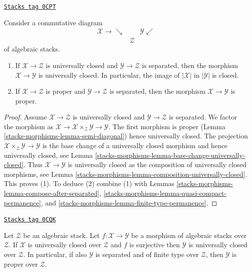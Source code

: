 \begin{lemma}
\label{stacks-morphisms-lemma-universally-closed-permanence}
\href{https://stacks.math.columbia.edu/tag/0CPT}{\texttt{Stacks tag 0CPT}}

Consider a commutative diagram
$$
\begin{array}{ccc}\mathcal{X} \longrightarrow\searrow &  & \mathcal{Y} \swarrow \\  & \mathcal{Z} & \end{array}
$$
of algebraic stacks.
\begin{enumerate}
\item If $\mathcal{X} \to \mathcal{Z}$ is universally closed and
$\mathcal{Y} \to \mathcal{Z}$ is separated,
then the morphism $\mathcal{X} \to \mathcal{Y}$ is universally closed.
In particular, the image of $|\mathcal{X}|$ in $|\mathcal{Y}|$ is closed.
\item If $\mathcal{X} \to \mathcal{Z}$ is proper and
$\mathcal{Y} \to \mathcal{Z}$ is separated, then
the morphism $\mathcal{X} \to \mathcal{Y}$ is proper.
\end{enumerate}
\end{lemma}

\begin{proof}
Assume $\mathcal{X} \to \mathcal{Z}$ is universally closed and
$\mathcal{Y} \to \mathcal{Z}$ is separated.
We factor the morphism as
$\mathcal{X} \to \mathcal{X} \times_\mathcal{Z} \mathcal{Y} \to \mathcal{Y}$.
The first morphism is proper (Lemma \ref{stacks-morphisms-lemma-semi-diagonal})
hence universally closed.
The projection $\mathcal{X} \times_\mathcal{Z} \mathcal{Y} \to \mathcal{Y}$
is the base change of a universally closed morphism and hence
universally closed, see
Lemma \ref{stacks-morphisms-lemma-base-change-universally-closed}.
Thus $\mathcal{X} \to \mathcal{Y}$ is universally closed as the composition
of universally closed morphisms, see
Lemma \ref{stacks-morphisms-lemma-composition-universally-closed}.
This proves (1). To deduce (2) combine (1) with
Lemmas \ref{stacks-morphisms-lemma-compose-after-separated},
\ref{stacks-morphisms-lemma-quasi-compact-permanence}, and
\ref{stacks-morphisms-lemma-finite-type-permanence}.
\end{proof}

\begin{lemma}
\label{stacks-morphisms-lemma-image-proper-is-proper}
\href{https://stacks.math.columbia.edu/tag/0CQK}{\texttt{Stacks tag 0CQK}}

Let $\mathcal{Z}$ be an algebraic stack.
Let $f : \mathcal{X} \to \mathcal{Y}$
be a morphism of algebraic stacks over $\mathcal{Z}$.
If $\mathcal{X}$ is universally closed over $\mathcal{Z}$
and $f$ is surjective then $\mathcal{Y}$
is universally closed over $\mathcal{Z}$.
In particular, if also $\mathcal{Y}$ is
separated and of finite type over $\mathcal{Z}$,
then $\mathcal{Y}$ is proper over $\mathcal{Z}$.
\end{lemma}

